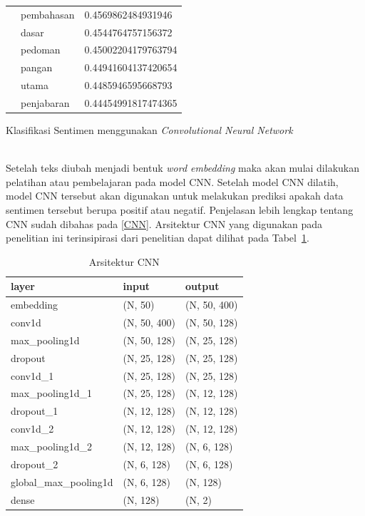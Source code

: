 \begin{enumerate}
\begin{longtable}[c]{|l|l|l|}
                                  & pembahasan      & 0.4569862484931946  \\ \cline{2-3}
                                  & dasar           & 0.4544764757156372  \\ \cline{2-3}
                                  & pedoman         & 0.45002204179763794 \\ \cline{2-3}
                                  & pangan          & 0.44941604137420654 \\ \cline{2-3}
                                  & utama           & 0.4485946595668793  \\ \cline{2-3}
                                  & penjabaran      & 0.44454991817474365 \\ \hline
  \end{longtable}

  {\bfseries \item Klasifikasi Sentimen menggunakan \emph{Convolutional Neural Network}}\\
  Setelah teks diubah menjadi bentuk \emph{word embedding} maka akan mulai dilakukan pelatihan
  atau pembelajaran pada model CNN\@. Setelah model CNN dilatih, model CNN tersebut akan digunakan
  untuk melakukan prediksi apakah data sentimen tersebut berupa positif atau negatif. Penjelasan
  lebih lengkap tentang CNN sudah dibahas pada \autoref{CNN}. Arsitektur CNN yang digunakan pada
  penelitian ini terinsipirasi dari penelitian \citep{Kowsari2019} dapat dilihat pada Tabel~\ref{tab:cnn_architecture}.

  \begin{table}[H]
    \centering
    \caption{Arsitektur CNN}
    \label{tab:cnn_architecture}
    \begin{tabularx}{\columnwidth}{|l|l|l|}
      \hline
      layer & input & output \\ \hline
      embedding & (N, 50) & (N, 50, 400) \\ \hline
      conv1d & (N, 50, 400) & (N, 50, 128) \\ \hline
      max\_pooling1d & (N, 50, 128) & (N, 25, 128) \\ \hline
      dropout & (N, 25, 128) & (N, 25, 128) \\ \hline
      conv1d\_1 & (N, 25, 128) & (N, 25, 128) \\ \hline
      max\_pooling1d\_1 & (N, 25, 128) & (N, 12, 128) \\ \hline
      dropout\_1 & (N, 12, 128) & (N, 12, 128) \\ \hline
      conv1d\_2 & (N, 12, 128) & (N, 12, 128) \\ \hline
      max\_pooling1d\_2 & (N, 12, 128) & (N, 6, 128) \\ \hline
      dropout\_2 & (N, 6, 128) & (N, 6, 128) \\ \hline
      global\_max\_pooling1d & (N, 6, 128) & (N, 128) \\ \hline
      dense & (N, 128) & (N, 2) \\ \hline
    \end{tabularx}
  \end{table}
\end{enumerate}

